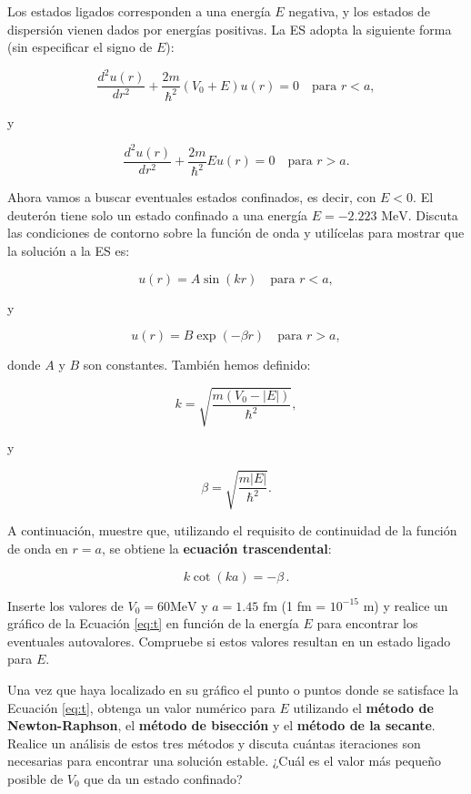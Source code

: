\documentclass[12pt]{article}
\begin{document}
\begin{enumerate}[label=\textbf{\arabic*.}]
Los estados ligados corresponden a una energía $E$ negativa, y los estados de dispersión vienen dados por energías positivas. La ES adopta la siguiente forma (sin especificar el signo de $E$):

\[
\frac{d^2 u(r)}{dr^2} + \frac{2m}{\hbar^2}(V_0 + E)u(r) = 0 \quad \text{para } r < a,
\]

y

\[
\frac{d^2 u(r)}{dr^2} + \frac{2m}{\hbar^2}E u(r) = 0 \quad \text{para } r > a.
\]

Ahora vamos a buscar eventuales estados confinados, es decir, con $E < 0$. El deuterón tiene solo un estado confinado a una energía $E = -2.223 \text{ MeV}$. Discuta las condiciones de contorno sobre la función de onda y utilícelas para mostrar que la solución a la ES es:

\[
u(r) = A \sin(kr) \quad \text{para } r < a,
\]

y

\[
u(r) = B \exp (-\beta r) \quad \text{para } r > a,
\]

donde $A$ y $B$ son constantes. También hemos definido:

\[
k = \sqrt{\frac{m(V_0 - |E|)}{\hbar^2}},
\]

y

\[
\beta = \sqrt{\frac{m|E|}{\hbar^2}}.
\]

A continuación, muestre que, utilizando el requisito de continuidad de la función de onda en $r = a$, se obtiene la \textbf{ecuación trascendental}:

\begin{equation}\label{eq:t}
    k \cot(ka) = -\beta\,. 
\end{equation}



Inserte los valores de $V_0 = 60 \text{MeV}$ y $a = 1.45 \text{ fm}$ (1 fm = $10^{-15}$ m) y realice un gráfico de la Ecuación \eqref{eq:t} en función de la energía $E$ para encontrar los eventuales autovalores. Compruebe si estos valores resultan en un estado ligado para $E$.

Una vez que haya localizado en su gráfico el punto o puntos donde se satisface la Ecuación \eqref{eq:t}, obtenga un valor numérico para $E$ utilizando el \textbf{método de Newton-Raphson}, el \textbf{método de bisección} y el \textbf{método de la secante}. Realice un análisis de estos tres métodos y discuta cuántas iteraciones son necesarias para encontrar una solución estable. ¿Cuál es el valor más pequeño posible de $V_0$ que da un estado confinado?
 

\end{enumerate}
\end{document}
